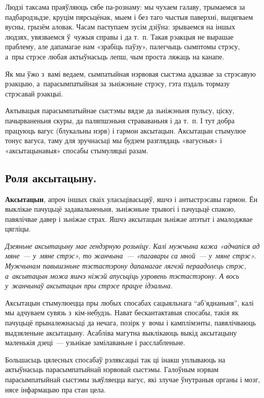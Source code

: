 Людзі таксама праяўляюць сябе па-рознаму: мы чухаем галаву, трымаемся за падбародзьдзе, круцім пярсьцёнак, мыем і без таго чыстыя паверхні, выцягваем вусны, грызём аловак. Часам паступаем зусім дзіўна: зрываемся на іншых людзях, увязваемся ў~чужыя справы і да т.~п. Такая рэакцыя не вырашае праблему, але дапамагае нам «зрабіць паўзу», палегчыць сымптомы стрэсу, а~пры стрэсе любая актыўнасьць лепш, чым проста ляжаць на канапе. 


Як мы ўжо з~вамі ведаем, сымпатыйная нэрвовая сыстэма адказвае за стрэсавую рэакцыю, а~парасымпатыйная за зьніжэньне стрэсу, гэта пэдаль тормазу стрэсавай рэакцыі. 

Актывацыя парасымпатыйнае сыстэмы вядзе да зьніжэньня пульсу, ціску, пачырваненьня скуры, да паляпшэньня страваваньня і да т.~п. І тут добра працуюць вагус (блукальны нэрв) і гармон аксытацын. Аксытацын стымулюе тонус вагуса, таму для зручнасьці мы будзем разглядаць «вагусныя» і «аксытацынавыя» спосабы стымуляцыі разам.

\subsection*{Роля аксытацыну.}

\textbf{Аксытацын}, апроч іншых сваіх уласьцівасьцяў, яшчэ і антыстрэсавы гармон. Ён выклікае пачуцьцё задавальненьня, зьніжэньне трывогі і пачуцьцё спакою, павялічвае давер і зьніжае страх. Яшчэ аксытацын зьніжае апэтыт і амалоджвае цягліцы. 

\emph{Дзеяньне аксытацыну мае гендэрную розьніцу. Калі мужчына кажа «адчапіся ад мяне~--- у~мяне стрэс», то жанчына~--- «пагавары са мной~--- у~мяне стрэс». Мужчынам павышэньне тэстастэрону дапамагае лягчэй пераадолець стрэс, а~аксытацын можа яшчэ ніжэй апусьціць узровень тэстастэрону. А вось у~жанчынаў аксытацын пры стрэсе працуе ідэальна.}

Аксытацын стымулюецца пры любых спосабах сацыяльнага ``аб'яднаньня'', калі мы адчуваем сувязь з~кім-небудзь. Нават бескантактавыя спосабы, такія як пачуцьцё прыналежнасьці да нечага, позірк у~вочы і камплімэнты, павялічваюць выдзяленьне аксытацыну. Асабліва магутна выклікаюць выкід аксытацыну маленькія дзеці~--- узьнікае замілаваньне і расслабленьне. 

Большасьць цялесных спосабаў рэляксацыі так ці інакш уплываюць на актыўнасьць парасымпатыйнай нэрвовай сыстэмы. Галоўным нэрвам парасымпатыйнай сыстэмы зьяўляецца вагус, які злучае ўнутраныя органы і мозг, нясе інфармацыю пра стан цела. 

